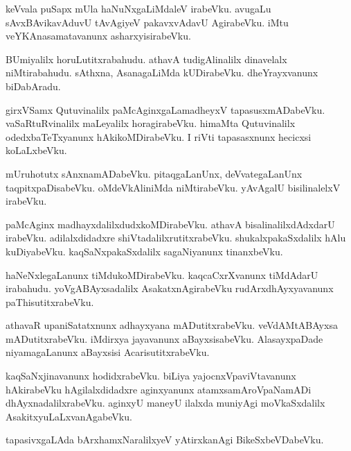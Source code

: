 \documentclass{article}
\begin{document}
\begin{mn}
keVvala puSapx mUla haNuNxgaLiMdaleV irabeVku. avugaLu sAvxBAvikavAduvU tAvAgiyeV pakavxvAdavU 
AgirabeVku. iMtu veYKAnasamatavanunx asharxyisirabeVku.
\end{mn}

\begin{mn}
BUmiyalilx horuLutitxrabahudu. athavA tudigAlinalilx dinavelalx niMtirabahudu. sAthxna, 
AsanagaLiMda kUDirabeVku. dheYrayxvanunx biDabAradu.
\end{mn}

\begin{mn}
girxVSamx Qutuvinalilx paMcAginxgaLamadheyxV tapasusxmADabeVku. vaSaRtuRvinalilx maLeyalilx 
horagirabeVku. himaMta Qutuvinalilx odedxbaTeTxyanunx hAkikoMDirabeVku. I riVti tapasasxnunx 
hecicxsi koLaLxbeVku.
\end{mn}

\begin{mn}
mUruhotutx sAnxnamADabeVku. pitaqgaLanUnx, deVvategaLanUnx taqpitxpaDisabeVku. oMdeVkAliniMda 
niMtirabeVku. yAvAgalU bisilinalelxV irabeVku.
\end{mn}

\begin{mn}
paMcAginx madhayxdalilxdudxkoMDirabeVku. athavA bisalinalilxdAdxdarU irabeVku. adilalxdidadxre 
shiVtadalilxrutitxrabeVku. shukalxpakaSxdalilx hAlu kuDiyabeVku. kaqSaNxpakaSxdalilx sagaNiyanunx 
tinanxbeVku.
\end{mn}

\begin{mn}
haNeNxlegaLanunx tiMdukoMDirabeVku. kaqcaCxrXvanunx tiMdAdarU irabahudu. yoVgABAyxsadalilx 
AsakatxnAgirabeVku rudArxdhAyxyavanunx paThisutitxrabeVku.
\end{mn}

\begin{mn}
athavaR upaniSatatxnunx adhayxyana mADutitxrabeVku. veVdAMtABAyxsa mADutitxrabeVku. iMdirxya 
jayavanunx aBayxsisabeVku. AlasayxpaDade niyamagaLanunx aBayxsisi AcarisutitxrabeVku.
\end{mn}

\begin{mn}
kaqSaNxjinavanunx hodidxrabeVku. biLiya yajocnxVpaviVtavanunx hAkirabeVku hAgilalxdidadxre 
aginxyanunx atamxsamAroVpaNamADi dhAyxnadalilxrabeVku. aginxyU maneyU ilalxda muniyAgi 
moVkaSxdalilx AsakitxyuLaLxvanAgabeVku.
\end{mn}

\begin{mn}
tapasivxgaLAda bArxhamxNaralilxyeV yAtirxkanAgi BikeSxbeVDabeVku.
\end{mn}
\end{document}
